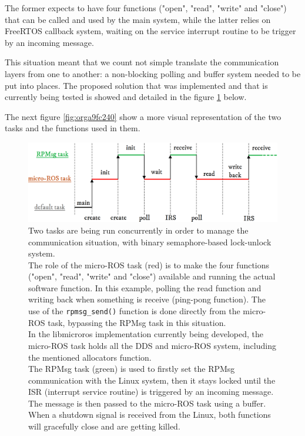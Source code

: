 \documentclass[10pt]{article}
\begin{document}
The former expects to have four functions ("open", "read", "write" and "close") that can
be called and used by the main system, while the latter relies on FreeRTOS callback
system, waiting on the service interrupt routine to be trigger by an incoming message.

This situation meant that we count not simple translate the communication layers from one
to another: a non-blocking polling and buffer system needed to be put into places.
The proposed solution that was implemented and that is currently being tested
is showed and detailed in the figure \ref{fig:org8631684} below.

The next figure \ref{fig:orga9fc240} show a more visual representation of the two tasks and the
functions used in them.

\begin{figure}[htbp]
\centering
\includegraphics[width=.9\textwidth]{./img/tasks.png}
\caption{\label{fig:org8631684}Two tasks are being run concurrently in order to manage the communication situation, with binary semaphore-based lock-unlock system.\\[0pt]
 The role of the micro-ROS task (red) is to make the four functions ("open", "read", "write" and "close")  available and running the actual software function. In this example, polling the read function and writing back when something is receive (ping-pong function). The use of the \texttt{rpmsg\_send()} function is done directly from the micro-ROS task, bypassing the RPMsg task in this situation.\\[0pt]
 In the libmicroros implementation currently being developed, the micro-ROS task holds all the DDS and micro-ROS system, including the mentioned allocators function.\\[0pt]
 The RPMsg task (green) is used to firstly set the RPMsg communication with the Linux system, then it stays locked until the ISR (interrupt service routine) is triggered by an incoming message. The message is then passed to the micro-ROS task using a buffer.\\[0pt]
 When a shutdown signal is received from the Linux, both functions will gracefully close and are getting killed.}
\end{figure}
\end{document}
